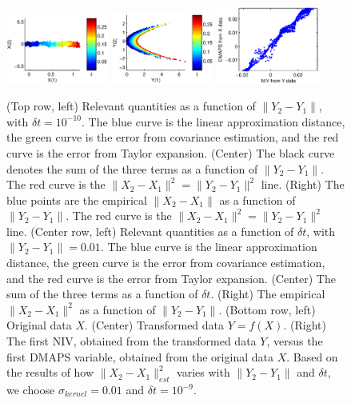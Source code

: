 \documentclass[12pt]{article}
\begin{document}
\begin{figure}
\includegraphics[width=0.3\textwidth]{original_data}
\includegraphics[width=0.3\textwidth]{transformed_data}
\includegraphics[width=0.3\textwidth]{NIV_correlation}

\caption{(Top row, left) Relevant quantities as a function of $\|Y_2 - Y_1\|$, with $\delta t = 10^{-10}$. The blue curve is the linear approximation distance, the green curve is the error from covariance estimation, and the red curve is the error from Taylor expansion.  (Center) The black curve denotes the sum of the three terms as a function of $\|Y_2 - Y_1\|$. The red curve is the $\|X_2 - X_1\|^2 = \|Y_2 - Y_1\|^2$ line. (Right) The blue points are the empirical $\| X_2 - X_1 \|$ as a function of $\|Y_2 - Y_1\|$. The red curve is the $\| X_2 - X_1 \|^2 = \|Y_2 - Y_1\|^2$ line. (Center row, left) Relevant quantities as a function of $\delta t$, with $\|Y_2 - Y_1\| = 0.01$. The blue curve is the linear approximation distance, the green curve is the error from covariance estimation, and the red curve is the error from Taylor expansion. (Center) The sum of the three terms as a function of $\delta t$. (Right) The empirical $\| X_2 - X_1 \|^2$ as a function of $\|Y_2 - Y_1\|$. (Bottom row, left) Original data $X$. (Center) Transformed data $Y = f(X)$. (Right) The first NIV, obtained from the transformed data $Y$, versus the first DMAPS variable, obtained from the original data $X$. Based on the results of how $\| X_2 - X_1 \|^2_{est}$ varies with $\| Y_2 - Y_1\|$ and $\delta t$, we choose $\sigma_{kernel} = 0.01$ and $\delta t = 10^{-9}$. }
\end{figure}
\end{document}
